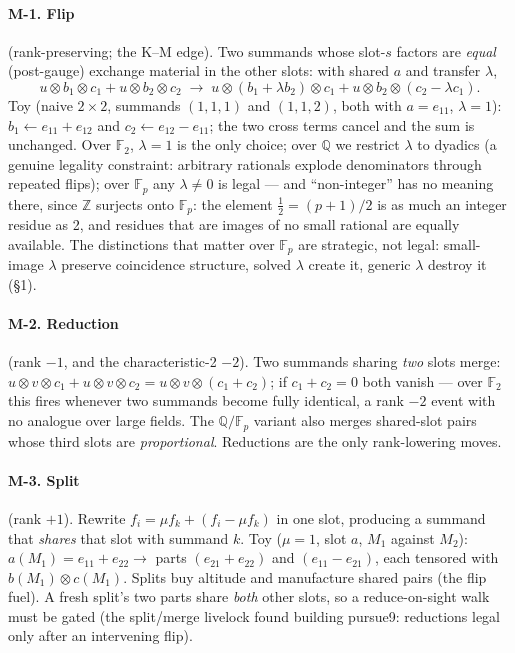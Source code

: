 \documentclass[10pt]{article}
\begin{document}
\paragraph{M-1. Flip} (rank-preserving; the K--M edge). Two
summands whose slot-$s$ factors are \emph{equal} (post-gauge)
exchange material in the other slots: with shared $a$ and transfer
$\lambda$,
\[
u\otimes b_1\otimes c_1 + u\otimes b_2\otimes c_2
\;\to\;
u\otimes(b_1{+}\lambda b_2)\otimes c_1 +
u\otimes b_2\otimes(c_2{-}\lambda c_1).
\]
Toy (naive $2{\times}2$, summands $(1,1,1)$ and $(1,1,2)$, both
with $a = e_{11}$, $\lambda = 1$): $b_1 \leftarrow e_{11}+e_{12}$
and $c_2 \leftarrow e_{12}-e_{11}$; the two cross terms cancel and
the sum is unchanged. Over $\mathbb{F}_2$, $\lambda = 1$ is the
only choice; over $\mathbb{Q}$ we restrict $\lambda$ to dyadics
(a genuine legality constraint: arbitrary rationals explode
denominators through repeated flips); over $\mathbb{F}_p$ any
$\lambda \ne 0$ is legal --- and ``non-integer'' has no meaning
there, since $\mathbb{Z}$ surjects onto $\mathbb{F}_p$: the
element $\tfrac12 = (p{+}1)/2$ is as much an integer residue as
2, and residues that are images of no small rational are equally
available. The distinctions that matter over $\mathbb{F}_p$ are
strategic, not legal: small-image $\lambda$ preserve coincidence
structure, solved $\lambda$ create it, generic $\lambda$ destroy
it (\S1).

\paragraph{M-2. Reduction} (rank $-1$, and the characteristic-2
$-2$). Two summands sharing \emph{two} slots merge:
$u\otimes v\otimes c_1 + u\otimes v\otimes c_2 =
u\otimes v\otimes(c_1{+}c_2)$; if $c_1 + c_2 = 0$ both vanish ---
over $\mathbb{F}_2$ this fires whenever two summands become fully
identical, a rank $-2$ event with no analogue over large fields.
The $\mathbb{Q}/\mathbb{F}_p$ variant also merges shared-slot pairs
whose third slots are \emph{proportional}. Reductions are the only
rank-lowering moves.

\paragraph{M-3. Split} (rank $+1$). Rewrite
$f_i = \mu f_k + (f_i - \mu f_k)$ in one slot, producing a summand
that \emph{shares} that slot with summand $k$. Toy ($\mu{=}1$, slot
$a$, $M_1$ against $M_2$): $a(M_1) = e_{11}+e_{22} \to$ parts
$(e_{21}{+}e_{22})$ and $(e_{11}{-}e_{21})$, each tensored with
$b(M_1)\otimes c(M_1)$. Splits buy altitude and manufacture shared
pairs (the flip fuel). A fresh split's two parts share \emph{both}
other slots, so a reduce-on-sight walk must be gated (the
split/merge livelock found building pursue9: reductions legal only
after an intervening flip).
\end{document}
